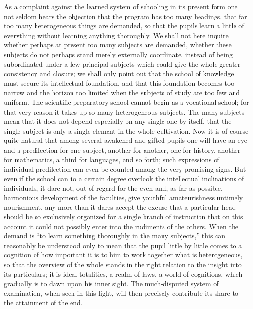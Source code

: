 \documentclass[12pt,a4paper,openany]{book}
\newcommand{\opage}[1]{\marginnote{\footnotesize\textit{[#1]}}}
\begin{document}
As a complaint against the learned system of schooling in its
present form one not seldom hears the objection that
the program has too many headings, that far too
many heterogeneous things are demanded, so that the pupils learn a little
of everything without learning anything thoroughly. We shall not here
inquire whether perhaps at present too
many subjects are demanded, whether these subjects do not perhaps stand
merely externally coordinate, instead of being subordinated under
a few principal subjects which could give the whole greater consistency
and closure; we shall only point out
that the school of knowledge must secure its intellectual foundation,
and that this foundation becomes too narrow and the horizon
too limited when the subjects of study are too
few and uniform. The scientific preparatory school
cannot begin as a vocational school; for that very reason
\setcounter{footnote}{0}%
\opage{301}it takes up so many heterogeneous subjects. The
many subjects mean that it does not depend especially on
any single one by itself, that the single subject is only a single element
in the whole cultivation. Now it is of course quite natural
that among several awakened and gifted pupils one will
have an eye and a predilection for one subject, another for
another, one for history, another for mathematics, a
third for languages, and so forth; such expressions of individual
predilection can even be counted among the
very promising signs. But even if the school can to a certain degree
overlook the intellectual inclinations of individuals,
it dare not, out of regard for the even and, as far as possible, harmonious
development of the faculties, give youthful
amateurishness untimely nourishment, any more than it dares
accept the excuse that a particular head should
be so exclusively organized for a single branch of instruction that
on this account it could not possibly enter
into the rudiments of the others. When the demand is
``to learn something thoroughly in the many subjects,'' this
can reasonably be understood only to mean that the pupil little by
little comes to a cognition of how important it
is to him to work together what is heterogeneous, so that
the overview of the whole stands in the right relation
to the insight into its particulars; it is ideal totalities,
a realm of laws, a world of cognitions, which
gradually is to dawn upon his inner sight. The much-disputed
system of examination, when seen in
this light, will then precisely contribute its share to the attainment of the end.
\end{document}
